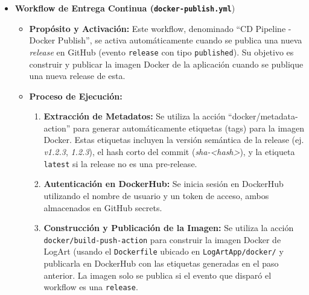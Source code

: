 \begin{itemize}
\begin{itemize}
\begin{enumerate}
                        \item \textbf{Generación de Artefactos} Si las pruebas de Playwright finalizan (incluso si fallan, siempre que el workflow no se cancele), se sube el informe de Playwright (\texttt{playwright-report} como un artefacto, facilitando la depuración de errores en las pruebas E2E.
                    \end{enumerate}
                    \item Este pipeline asegura que cada cambio propuesto sea verificado exhaustivamente antes de ser mergeado. La información detallada sobre la estrategia de integración y algunos problemas resueltos, se encuentran en el blog del autor\cite{MorenoCILogArt}
            \end{itemize}
            \vspace{0.3cm}
        \item \textbf{Workflow de Entrega Continua (\texttt{docker-publish.yml}})
            \begin{itemize}
                \item \textbf{Propósito y Activación:} Este workflow, denominado ``CD Pipeline - Docker Publish'', se activa automáticamente cuando se publica una nueva \textit{release} en GitHub (evento \texttt{release} con tipo \texttt{published}). Su objetivo es construir y publicar la imagen Docker de la aplicación cuando se publique una nueva release de esta.
                \item \textbf{Proceso de Ejecución:}
                    \begin{enumerate}
                        \item \textbf{Extracción de Metadatos:} Se utiliza la acción ``docker/metadata-action'' para generar automáticamente etiquetas (tags) para la imagen Docker. Estas etiquetas incluyen la versión semántica de la release (ej. \textit{v1.2.3}, \textit{1.2.3}), el hash corto del commit (\textit{sha-\textless hash\textgreater}), y la etiqueta \texttt{latest} si la release no es una pre-release.
                        \item \textbf{Autenticación en DockerHub:} Se inicia sesión en DockerHub utilizando el nombre de usuario y un token de acceso, ambos almacenados en GitHub secrets.
                        \item \textbf{Construcción y Publicación de la Imagen:} Se utiliza la acción \texttt{docker/build-push-action} para construir la imagen Docker de LogArt (usando el \texttt{Dockerfile} ubicado en \texttt{LogArtApp/docker/} y publicarla en DockerHub con las etiquetas generadas en el paso anterior. La imagen solo se publica si el evento que disparó el workflow es una \texttt{release}.

\end{enumerate}
\end{itemize}
\end{itemize}
